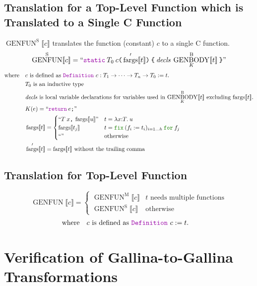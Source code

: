 \documentclass[a4paper,fleqn]{article}
\def\gallina{\textrm{Gallina}}
\newcommand{\kwDefinition}{\mbox{\color{myviolet}\ttfamily Definition}}
\newcommand{\kwfix}{\mbox{\color{mygreen}\ttfamily fix}}
\newcommand{\kwfor}{\mbox{\color{mygreen}\ttfamily for}}
\newcommand{\lamT}[3]{\lambda #1\mathord{:}#2.\:#3}
\newcommand{\fix}[4]{\kwfix\:(#1 := #2)_{#3}\:\kwfor\:#4}
\newcommand{\BRA}[1]{\llbracket #1 \rrbracket}
\DeclareMathOperator{\genbody}{GENBODY}
\newcommand{\genbodyb}[2]{\genbody^\mathrm{B}_{#1}\BRA{#2}}
\DeclareMathOperator{\genfunop}{GENFUN}
\newcommand{\genfun}[1]{\genfunop\BRA{#1}}
\newcommand{\genfuns}[1]{\genfunop^\mathrm{S}\BRA{#1}}
\newcommand{\genfunm}[1]{\genfunop^\mathrm{M}\BRA{#1}}
\newcommand{\dq}[1]{\text{``}#1\text{''}}
\newcommand{\ttparen}[1]{\texttt{(}#1\texttt{)}}
\newcommand{\ttlbrace}{\texttt{\char '173}}
\newcommand{\ttrbrace}{\texttt{\char '175}}
\newcommand{\ttbrace}[1]{\ttlbrace#1\ttrbrace}
\newcommand{\ttsemi}{\texttt{;}}
\newcommand{\ttcomma}{\texttt{,}}
\newcommand{\kwCreturn}{\mbox{\color{myviolet}\ttfamily return}}
\newcommand{\kwstatic}{\mbox{\color{myviolet}\ttfamily static}}
\DeclareMathOperator{\fargsop}{fargs}
\newcommand{\fargs}[1]{\fargsop\BRA{#1}}
\newcommand{\fargsd}[1]{\fargsop'\BRA{#1}}
\begin{document}
\subsection{Translation for a Top-Level Function which is Translated to a Single C Function}\label{sec:genfuns}
$\genfuns{c}$ translates the function (constant) $c$ to a single C function.
\[
  \genfuns{c} = \dq{\kwstatic\:T_0\:c\ttparen{\fargsd{t}}\:\ttbrace{\:\mathit{decls}\:\genbodyb{K}{t}\:}}
\]
\[ \text{where} \quad
  \begin{aligned}[t]
    & \text{$c$ is defined as \kwDefinition~$c : T_1 \rightarrow \dotsb \rightarrow T_n \rightarrow T_0 := t.$} \\
    & \text{$T_0$ is an inductive type} \\
    & \text{$\mathit{decls}$ is local variable declarations for variables used in $\genbodyb{K}{t}$ excluding $\fargs{t}$.} \\
    & K(e) = \dq{\kwCreturn\:e\ttsemi} \\
    & \fargs{t} =
      \begin{cases}
        \dq{T\:x\ttcomma\:\fargs{u}}      & t = \lamT{x}{T}{u} \\
        \fargs{t_j}       & t = \fix{f_i}{t_i}{i=1\ldots h}{f_j} \\
        \dq{}    & \text{otherwise}
      \end{cases} \\
    & \fargsd{t} = \fargs{t}~\text{without the trailing comma}
  \end{aligned}
\]

\subsection{Translation for Top-Level Function}\label{sec:genfun}
\[
  \genfun{c} =
  \begin{cases}
    \genfunm{c} & \text{$t$ needs multiple functions} \\
    \genfuns{c} & \text{otherwise}
  \end{cases}
\]
\[ \text{where} \quad
  \begin{aligned}[t]
    & \text{$c$ is defined as \kwDefinition~$c := t.$}
  \end{aligned}
\]

\section{Verification of \gallina-to-\gallina{} Transformations}\label{sec:verification-of-gallina-to-gallina-transformations}
\end{document}
